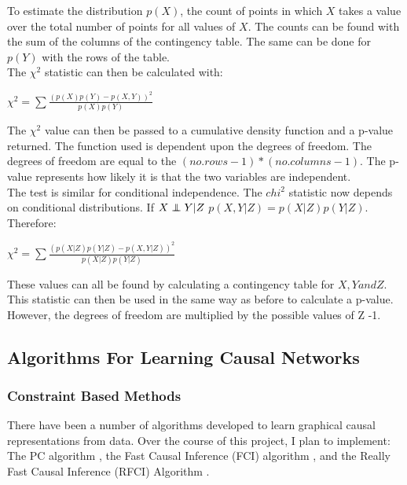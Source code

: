 \documentclass{article}
\newcommand\independent{\protect\mathpalette{\protect\independenT}{\perp}}
\def\independenT#1#2{\mathrel{\rlap{$#1#2$}\mkern2mu{#1#2}}}
\begin{document}
To estimate the distribution $p(X)$, the count of points in which $X$ takes a value over the total number of points for all values of $X$. The counts can be found with the sum of the columns of the contingency table. The same can be done for $p(Y)$ with the rows of the table.\\

The $\chi^2$ statistic can then be calculated with:

\begin{center}
	$\chi^2 = \sum\frac{(p(X)p(Y)-p(X,Y))^2}{p(X)p(Y)}$
\end{center}

The $\chi^2$ value can then be passed to a cumulative density function and a p-value returned. The function used is dependent upon the degrees of freedom. The degrees of freedom are equal to the $(no. rows -1)*(no. columns -1)$. The p-value represents how likely it is that the two variables are independent.\\

The test is similar for conditional independence. The $chi^2$ statistic now depends on conditional distributions. If $X \independent Y | Z$ $p(X,Y|Z) = p(X|Z)p(Y|Z)$. Therefore:\\

\begin{center}
	$\chi^2 = \sum\frac{(p(X|Z)p(Y|Z)-p(X,Y|Z))^2}{p(X|Z)p(Y|Z)}$
\end{center}

These values can all be found by calculating a contingency table for $X,Y and Z$.\\

This statistic can then be used in the same way as before to calculate a p-value. However, the degrees of freedom are multiplied by the possible values of Z -1. 

\subsection{Algorithms For Learning Causal Networks}
\subsubsection{Constraint Based Methods}
There have been a number of algorithms developed to learn graphical causal representations from data. Over the course of this project, I plan to implement: The PC algorithm \cite{spirtes1991algorithm}, the Fast Causal Inference (FCI) algorithm \cite{colombo2012learning}, and the Really Fast Causal Inference (RFCI) Algorithm \cite{colombo2012learning}.
\\
\end{document}
